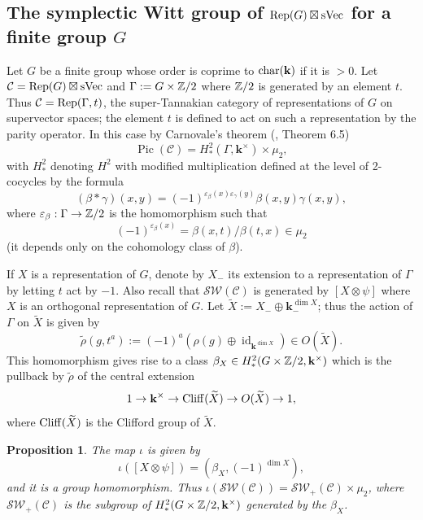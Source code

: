 \documentclass[12pt]{amsart}
\numberwithin{equation}{section}
\providecommand{\k}{}\renewcommand{\k}{\mathbf{k}}
\providecommand{\C}{}\renewcommand{\C}{\mathcal{C}}
\providecommand{\sVec}{}\renewcommand{\sVec}{\mathrm{sVec}}
\providecommand{\id}{}\renewcommand{\id}{\operatorname{id}}
\providecommand{\Pic}{}\renewcommand{\Pic}{\operatorname{Pic}}
\theoremstyle{plain}
\newtheorem{proposition}[theorem]{Proposition}
\theoremstyle{definition}
\theoremstyle{remark}
\begin{document}
\subsection{The symplectic Witt group of ${\rm Rep}(G)\boxtimes \sVec$ for a finite group $G$} 
Let $G$ be a finite group whose order is coprime to ${\rm char}(\k)$ if it is $>0$. Let $\C={\rm Rep}(G)\boxtimes \sVec$ and $\Gamma:=G\times \Bbb Z/2$ where $\Bbb Z/2$ is generated by an element $t$.
 Thus $\C={\rm Rep}(\Gamma,t)$, the super-Tannakian category of representations of $G$ on supervector spaces; the element $t$ is defined to act on such a representation by the parity operator. 
In this case by Carnovale's theorem (\cite{DN}, Theorem 6.5) 
$$
\Pic(\C)=H^2_*(\Gamma,\k^\times)\times \mu_2,
$$ 
with $H^2_*$ denoting $H^2$ with modified multiplication
 defined at the level of 2-cocycles 
by the formula
$$
(\beta*\gamma)(x,y)=(-1)^{\varepsilon_\beta(x)\varepsilon_\gamma(y)}\beta(x,y)\gamma(x,y),
$$
where $\varepsilon_\beta: \Gamma\to \Bbb Z/2$  is the homomorphism 
 such that
 $$
 (-1)^{\varepsilon_\beta(x)}=\beta(x,t)/\beta(t,x)\in \mu_2
$$
(it depends only on the cohomology class of $\beta$). 

If $X$ is a representation of $G$, denote by $X_-$ its extension to a representation of $\Gamma$ by letting $t$ act by $-1$. 
Also recall that ${\mathcal S\mathcal W}(\C)$ is generated by $[X\otimes \psi]$ 
where $X$ is an orthogonal representation of $G$. Let 
$\widetilde X:=X_-\oplus \k_-^{\dim X}$; thus the action of $\Gamma$ on $\widetilde X$ is given by 
$$
\widetilde\rho(g,t^a):=(-1)^a(\rho(g)\oplus \id_{\k^{\dim X}})\in O(\widetilde X).
$$ 
This homomorphism gives rise to a class $\beta_X\in H^2_*(G\times \Bbb Z/2,\k^\times)$ 
which is the pullback by $\widetilde\rho$ of the central extension 
$$
1\to \k^\times\to {\rm Cliff}(\widetilde X)\to O(\widetilde X)\to 1,
$$
where ${\rm Cliff}(\widetilde X)$ is the Clifford group of $\widetilde X$. 

\begin{proposition}\label{symwitt} The map $\iota$ is given by 
$$
\iota([X\otimes \psi])=(\beta_X,(-1)^{\dim X}),
$$ 
and it is a group homomorphism. Thus $\iota({\mathcal S\mathcal W}(\C))=\mathcal S\mathcal W_+(\C)\times \mu_2$, where $\mathcal S\mathcal W_+(\C)$ 
is the subgroup of $H^2_*(G\times \Bbb Z/2,\k^\times)$ generated by the $\beta_X$. 
\end{proposition} 
\end{document}
